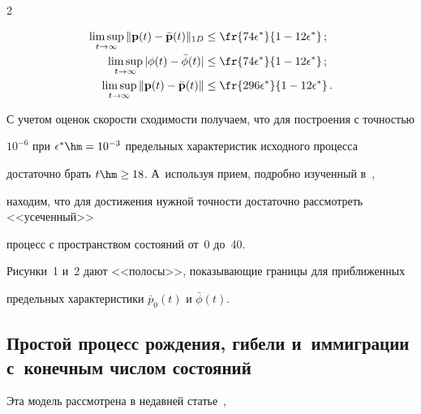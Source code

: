 \begin{multicols}{2}
\noindent

\begin{align*}

\limsup\limits_{t \to \infty}   \|{\bf p}(t)- {\bar{\bf p}}(t)\|_{1D} &\le

\fr{74\epsilon^*}{1 - 12\epsilon^*}\,;


\\

\limsup_{t \to \infty}  |\phi(t) - \bar{\phi}(t)|&\le

\fr{74\epsilon^*}{1 - 12\epsilon^*}\,;


\\

\limsup_{t \to \infty}   \|{\bf p}(t)- {\bar{\bf p}}(t)\| &\le

\fr{296\epsilon^*}{1 - 12\epsilon^*}\,.


\end{align*}



С учетом оценок скорости сходимости получаем, что для построения с точностью

$10^{-6}$ при $\epsilon^* \hm= 10^{-3}$ предельных характеристик исходного процесса

достаточно брать $t \hm\ge 18$. А~используя прием, подробно изученный в~\cite{z06},

находим, что для достижения нужной точности достаточно рассмотреть <<усеченный>>

процесс с  пространством состояний от~0 до~40.



Рисунки~1 и~2 дают <<полосы>>, показывающие границы для приближенных

предельных характеристики $\bar{p}_0(t)$ и $\bar{\phi}(t)$.





\vspace*{-5pt}



\subsection{Простой процесс рождения, гибели и~иммиграции с~конечным числом состояний}



Эта модель рассмотрена в недавней статье~\cite{z13a},


\end{multicols}
